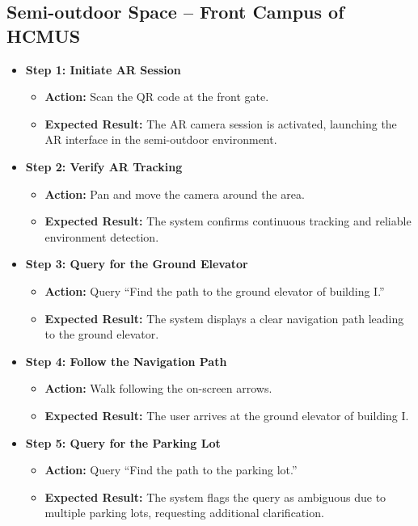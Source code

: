 \subsection{Semi-outdoor Space -- Front Campus of HCMUS}
\begin{itemize}
    \item \textbf{Step 1: Initiate AR Session}
    \begin{itemize}
        \item \textbf{Action:} Scan the QR code at the front gate.
        \item \textbf{Expected Result:} The AR camera session is activated, launching the AR interface in the semi-outdoor environment.
    \end{itemize}
    
    \item \textbf{Step 2: Verify AR Tracking}
    \begin{itemize}
        \item \textbf{Action:} Pan and move the camera around the area.
        \item \textbf{Expected Result:} The system confirms continuous tracking and reliable environment detection.
    \end{itemize}
    
    \item \textbf{Step 3: Query for the Ground Elevator}
    \begin{itemize}
        \item \textbf{Action:} Query “Find the path to the ground elevator of building I.”
        \item \textbf{Expected Result:} The system displays a clear navigation path leading to the ground elevator.
    \end{itemize}
    
    \item \textbf{Step 4: Follow the Navigation Path}
    \begin{itemize}
        \item \textbf{Action:} Walk following the on-screen arrows.
        \item \textbf{Expected Result:} The user arrives at the ground elevator of building I.
    \end{itemize}
    
    \item \textbf{Step 5: Query for the Parking Lot}
    \begin{itemize}
        \item \textbf{Action:} Query “Find the path to the parking lot.”
        \item \textbf{Expected Result:} The system flags the query as ambiguous due to multiple parking lots, requesting additional clarification.
    \end{itemize}
    

\end{itemize}
